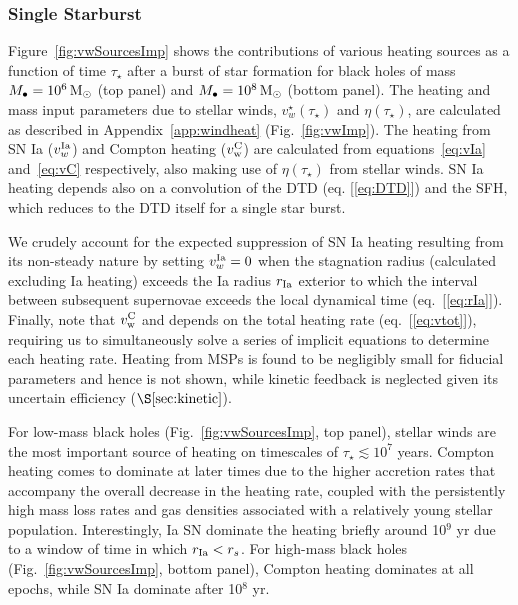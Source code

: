 \documentclass[usenatbib,fleqn]{mn2e}
\newcommand{\rs}{r_s}
\newcommand{\Mbh}[1][]{M_{\bullet#1}}
\begin{document}
\subsubsection{Single Starburst}

Figure~\ref{fig:vwSourcesImp} shows the contributions of various
heating sources as a function of time $\tau_{\star}$ after a burst of
star formation for black holes of mass $\Mbh = 10^{6} \Msun$ (top
panel) and $\Mbh = 10^{8} \Msun$ (bottom panel). The heating and mass
input parameters due to stellar winds, $v_{w}^{\star}(\tau_{\star})$
and $\eta(\tau_{\star})$, are calculated as described in
Appendix~\ref{app:windheat} (Fig.~\ref{fig:vwImp}).  The heating from
SN Ia ($v_{w}^{\rm Ia}$) and Compton heating ($v_{\rm w}^{\rm C}$) are
calculated from equations~\eqref{eq:vIa} and~\eqref{eq:vC}
respectively, also making use of $\eta(\tau_{\star})$ from stellar
winds.  SN Ia heating depends also on a convolution of the DTD
(eq. [\ref{eq:DTD}]) and the SFH, which reduces to
the DTD itself for a single star burst.

We crudely account for the expected suppression of SN Ia heating
resulting from its non-steady nature by setting $v_{w}^{\rm Ia} = 0$
when the stagnation radius (calculated excluding Ia heating) exceeds
the Ia radius $r_{\rm Ia}$ exterior to which the interval between
subsequent supernovae exceeds the local dynamical time
(eq.~[\ref{eq:rIa}]).  Finally, note that $v_{\rm w}^{\rm C}$ and
depends on the total heating rate (eq.~[\ref{eq:vtot}]), requiring us
to simultaneously solve a series of implicit equations to determine
each heating rate.  Heating from MSPs is found to be negligibly small
for fiducial parameters and hence is not shown, while kinetic feedback
is neglected given its uncertain efficiency ($\S\ref{sec:kinetic}$).

For low-mass black holes (Fig.~\ref{fig:vwSourcesImp}, top panel),
stellar winds are the most important source of heating on timescales
of $\tau_{\star} \lesssim 10^{7}$ years.  Compton heating comes to
dominate at later times due to the higher accretion rates that
accompany the overall decrease in the heating rate, coupled with the
persistently high mass loss rates and gas densities associated with a
relatively young stellar population.  Interestingly, Ia SN dominate
the heating briefly around 10$^{9}$ yr due to a window of time in
which $r_{ \rm Ia} < \rs$.  For high-mass black holes
(Fig.~\ref{fig:vwSourcesImp}, bottom panel), Compton heating dominates
at all epochs, while SN Ia dominate after 10$^{8}$ yr.
\end{document}
